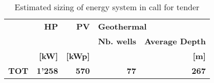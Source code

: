 \begin{table}[h!]
\centering
\caption{Estimated sizing of energy system in call for tender}\vspace{2mm}
\label{tab:ppa_prestudy_tot} 
\begin{tabular}{lrrrr}
\toprule
\textbf{} & \textbf{HP}    & \textbf{PV}    & \multicolumn{2}{l}{\textbf{Geothermal}} \\
         &       &       & \textbf{Nb. wells}        & \textbf{Average Depth}        \\
         & \textbf{[kW]} & \textbf{[kWp] } &                 & \textbf{[m] }         \\ \midrule
\textbf{TOT}      & \textbf{1'258}   & \textbf{570} & \textbf{77}              &    \textbf{267}         \\
\bottomrule
\end{tabular}
\end{table}